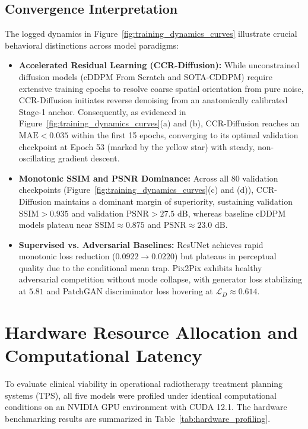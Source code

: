 \subsection{Convergence Interpretation}
The logged dynamics in Figure~\ref{fig:training_dynamics_curves} illustrate crucial behavioral distinctions across model paradigms:
\begin{itemize}
    \item \textbf{Accelerated Residual Learning (CCR-Diffusion):} While unconstrained diffusion models (cDDPM From Scratch and SOTA-CDDPM) require extensive training epochs to resolve coarse spatial orientation from pure noise, CCR-Diffusion initiates reverse denoising from an anatomically calibrated Stage-1 anchor. Consequently, as evidenced in Figure~\ref{fig:training_dynamics_curves}(a) and (b), CCR-Diffusion reaches an $\text{MAE} < 0.035$ within the first 15 epochs, converging to its optimal validation checkpoint at Epoch 53 (marked by the yellow star) with steady, non-oscillating gradient descent.
    \item \textbf{Monotonic SSIM and PSNR Dominance:} Across all 80 validation checkpoints (Figure~\ref{fig:training_dynamics_curves}(c) and (d)), CCR-Diffusion maintains a dominant margin of superiority, sustaining validation $\text{SSIM} > 0.935$ and validation $\text{PSNR} > 27.5\text{ dB}$, whereas baseline cDDPM models plateau near $\text{SSIM} \approx 0.875$ and $\text{PSNR} \approx 23.0\text{ dB}$.
    \item \textbf{Supervised vs. Adversarial Baselines:} ResUNet achieves rapid monotonic loss reduction ($0.0922 \to 0.0220$) but plateaus in perceptual quality due to the conditional mean trap. Pix2Pix exhibits healthy adversarial competition without mode collapse, with generator loss stabilizing at $5.81$ and PatchGAN discriminator loss hovering at $\mathcal{L}_D \approx 0.614$.
\end{itemize}

\section{Hardware Resource Allocation and Computational Latency}
To evaluate clinical viability in operational radiotherapy treatment planning systems (TPS), all five models were profiled under identical computational conditions on an NVIDIA GPU environment with CUDA 12.1. The hardware benchmarking results are summarized in Table~\ref{tab:hardware_profiling}.

